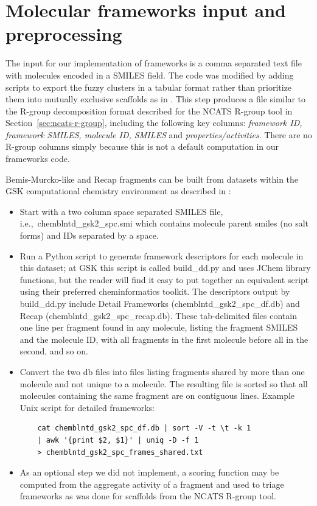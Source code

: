 \documentclass[11pt,letterpaper]{article}
\newcommand*\sref[1]{Section~\ref{sec:#1}}
\newcommand*\ie{i.e.,~}
\begin{document}
\newpage 

\section{Molecular frameworks input and preprocessing}
\label{sec:gskfw-prepro}
The input for our implementation of frameworks is a comma separated text file
with molecules encoded in a SMILES field.  The code was modified by
adding scripts to export the fuzzy clusters in a tabular format rather
than prioritize them into mutually exclusive scaffolds as in
\cite{Harper2004DDclus}. This step produces a file similar to
the R-group decomposition format described for the NCATS R-group tool
in \sref{ncats-r-group}, including the following key columns: \emph{framework
  ID, framework SMILES, molecule ID, SMILES} and
\emph{properties/activities}.  There are no R-group columns simply
because this is not a default computation in our frameworks code.

Bemis-Murcko-like and Recap fragments can be built from datasets within the GSK computational chemistry environment as described in \cite{Harper2004DDclus}:
\begin{itemize}
\item Start with a two column space separated SMILES file, \ie chemblntd\_gsk2\_spc.smi which contains molecule parent smiles (no salt forms) and IDs separated by a space. 
\item Run a Python script to generate framework descriptors for each molecule in this dataset; at GSK this script is called build\_dd.py and uses {JChem} library functions, but the reader will find it easy to put together an equivalent script using their preferred cheminformatics toolkit.  The descriptors output by build\_dd.py include Detail Frameworks (chemblntd\_gsk2\_spc\_df.db) and Recap (chemblntd\_gsk2\_spc\_recap.db). These tab-delimited files contain one line per fragment found in any molecule, listing the fragment SMILES and the molecule ID, with all fragments in the first molecule before all in the second, and so on.
\item Convert the two db files into files listing fragments shared by more than one molecule and not unique to a molecule. The resulting file is sorted so that all molecules containing the same fragment are on contiguous lines. Example Unix script for detailed frameworks:
  \begin{verbatim}
    cat chemblntd_gsk2_spc_df.db | sort -V -t \t -k 1
    | awk '{print $2, $1}' | uniq -D -f 1
    > chemblntd_gsk2_spc_frames_shared.txt
  \end{verbatim}
\item As an optional step we did not implement, a scoring function may be computed from the aggregate activity of a fragment and used to triage frameworks as was done for scaffolds from the NCATS R-group tool.   
    
\end{itemize}
\end{document}
